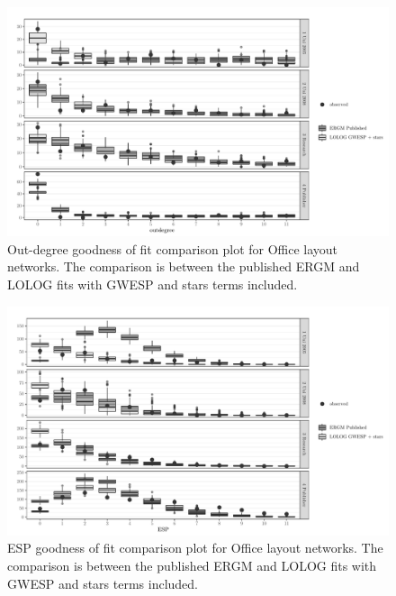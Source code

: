 \documentclass[
]{statsoc}
\begin{document}
\begin{figure}[H]

{\centering \includegraphics{ERGM_and_LOLOG_performance_real_world_files/figure-latex/unnamed-chunk-11-1} 

}

\caption{\label{fig:sailer_gof_gwesp_star_odeg}Out-degree goodness of fit comparison plot for Office layout networks. The comparison is between the published ERGM and LOLOG fits with GWESP and stars terms included.}\label{fig:unnamed-chunk-11}
\end{figure}

\begin{figure}[H]

{\centering \includegraphics{ERGM_and_LOLOG_performance_real_world_files/figure-latex/unnamed-chunk-12-1} 

}

\caption{\label{fig:sailer_gof_gwesp_star_esp}ESP goodness of fit comparison plot for Office layout networks. The comparison is between the published ERGM and LOLOG fits with GWESP and stars terms included.}\label{fig:unnamed-chunk-12}
\end{figure}
\end{document}

